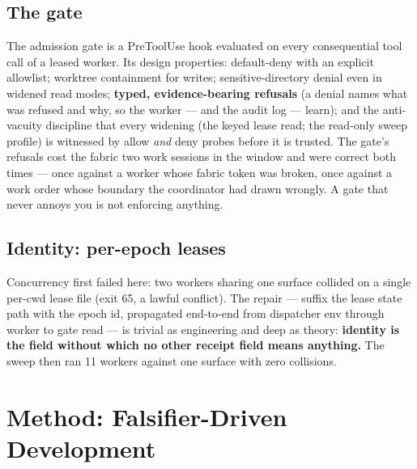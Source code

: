 \documentclass[11pt,a4paper]{article}
\theoremstyle{remark}
\begin{document}
\subsection{The gate}
The admission gate is a PreToolUse hook evaluated on every consequential tool call of a leased worker. Its design properties: default-deny with an explicit allowlist; worktree containment for writes; sensitive-directory denial even in widened read modes; \textbf{typed, evidence-bearing refusals} (a denial names what was refused and why, so the worker --- and the audit log --- learn); and the anti-vacuity discipline that every widening (the keyed lease read; the read-only sweep profile) is witnessed by allow \emph{and} deny probes before it is trusted. The gate's refusals cost the fabric two work sessions in the window and were correct both times --- once against a worker whose fabric token was broken, once against a work order whose boundary the coordinator had drawn wrongly. A gate that never annoys you is not enforcing anything.

\subsection{Identity: per-epoch leases}
Concurrency first failed here: two workers sharing one surface collided on a single per-cwd lease file (exit 65, a lawful conflict). The repair --- suffix the lease state path with the epoch id, propagated end-to-end from dispatcher env through worker to gate read --- is trivial as engineering and deep as theory: \textbf{identity is the field without which no other receipt field means anything.} The sweep then ran 11 workers against one surface with zero collisions.

\section{Method: Falsifier-Driven Development}
\end{document}
